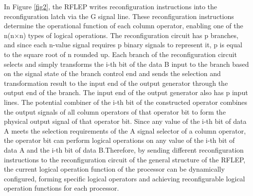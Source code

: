 \documentclass[electronics,article,accept,pdftex,moreauthors]{Definitions/mdpi}
\begin{document}
In Figure \ref{fig2}, the RFLEP writes reconfiguration instructions into the reconfiguration latch via the G signal line. These reconfiguration instructions determine the operational function of each column operator, enabling one of the n(n×n) types of logical operations. The reconfiguration circuit has p branches, and since each n-value signal requires p binary signals to represent it, p is equal to the square root of n rounded up. Each branch of the reconfiguration circuit selects and simply transforms the i-th bit of the data B input to the branch based on the signal state of the branch control end and sends the selection and transformation result to the input end of the output generator through the output end of the branch. The input end of the output generator also has p input lines. The potential combiner of the i-th bit of the constructed operator combines the output signals of all column operators of that operator bit to form the physical output signal of that operator bit. Since any value of the i-th bit of data A meets the selection requirements of the A signal selector of a column operator, the operator bit can perform logical operations on any value of the i-th bit of data A and the i-th bit of data B.Therefore, by sending different reconfiguration instructions to the reconfiguration circuit of the general structure of the RFLEP, the current logical operation function of the processor can be dynamically configured, forming specific logical operators and achieving reconfigurable logical operation functions for each processor.
\end{document}
